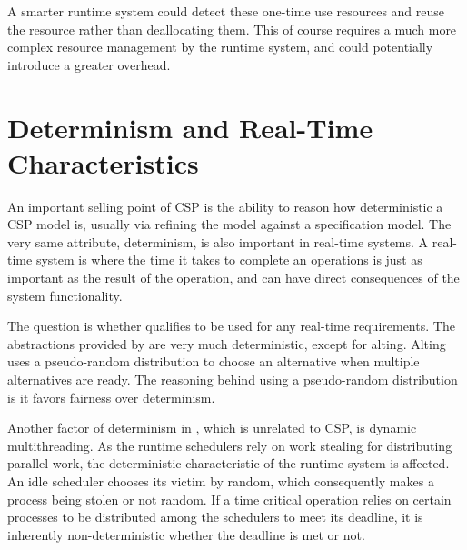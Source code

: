 A smarter runtime system could detect these one\hyp{}time use resources and reuse the resource rather than deallocating them. This of course requires a much more complex resource management by the runtime system, and could potentially introduce a greater overhead.


\section{Determinism and Real\hyp{}Time Characteristics}


An important selling point of CSP is the ability to reason how deterministic a CSP model is, usually via refining the model against a specification model. The very same attribute, determinism, is also important in real\hyp{}time systems. A real\hyp{}time system is where the time it takes to complete an operations is just as important as the result of the operation, and can have direct consequences of the system functionality.

The question is whether \Proxc{} qualifies to be used for any real\hyp{}time requirements. The abstractions provided by \Proxc{} are very much deterministic, except for alting. Alting uses a pseudo\hyp{}random distribution to choose an alternative when multiple alternatives are ready. The reasoning behind using a pseudo\hyp{}random distribution is it favors fairness over determinism.

Another factor of determinism in \Proxc{}, which is unrelated to CSP, is dynamic multithreading. As the runtime schedulers rely on work stealing for distributing parallel work, the deterministic characteristic of the runtime system is affected. An idle scheduler chooses its victim by random, which consequently makes a process being stolen or not random. If a time critical operation relies on certain processes to be distributed among the schedulers to meet its deadline, it is inherently non\hyp{}deterministic whether the deadline is met or not.

